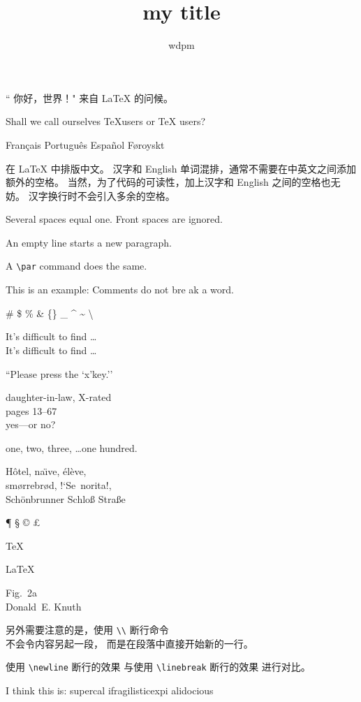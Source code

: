\documentclass{ctexart}
\begin{document}
    \title{my title}
    \author{wdpm}

    `` 你好，世界！" 来自 \LaTeX{} 的问候。

    Shall we call ourselves
    \TeX users
    or \TeX{} users?


    Français Português Español Føroyskt

    在 \LaTeX{} 中排版中文。
    汉字和 English 单词混排，通常不需要在中英文之间添加额外的空格。
    当然，为了代码的可读性，加上汉字和 English 之间的空格也无妨。
    汉字换行时不会引入多余的空格。


    Several spaces
    equal one.
    Front spaces are ignored.

    An empty line starts a new
    paragraph.\par
    A \verb|\par| command does
    the same.

    This is an %
    example: Comments do not bre%
    ak a word.

    \# \$ \% \& \{\} \_
    \^{} \~{} \textbackslash

    It's difficult to find \ldots \\
    It's dif{}f{}icult to f{}ind \ldots

    ``Please press the `x'key.''

    daughter-in-law, X-rated\\
    pages 13--67\\
    yes---or no?

    one, two, three, \ldots one hundred.

    H\^otel, na\"\i ve, \'el\`eve,\\
    sm\o rrebr\o d, !`Se\ norita!,\\
    Sch\"onbrunner Schlo\ss{}
    Stra\ss e

    \P{} \S{} \dag{} \ddag{}
    \copyright{} \pounds{}
    \textasteriskcentered
    \textperiodcentered
    \textbullet
    \textregistered{} \texttrademark

    \TeX

    \LaTeX

    \LaTeXe

    Fig.~2a \\
    Donald~E. Knuth

    另外需要注意的是，使用 \verb|\\|
    断行命令 \\ 不会令内容另起一段，
    而是在段落中直接开始新的一行。

    使用 \verb|\newline| 断行的效果
    \newline
    与使用 \verb|\linebreak| 断行的效果
    \linebreak
    进行对比。

    I think this is: su\-per\-cal\-%
    i\-frag\-i\-lis\-tic\-ex\-pi\-%
    al\-i\-do\-cious
\end{document}
